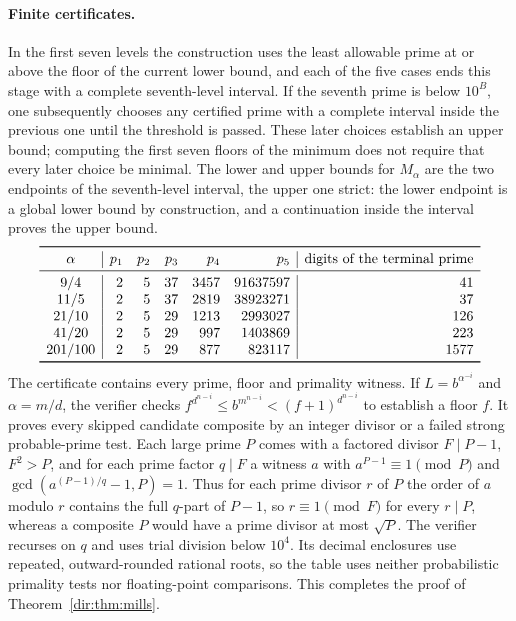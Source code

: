 \paragraph{Finite certificates.}
In the first seven levels the construction uses the least allowable prime at or above
the floor of the current lower bound, and each of the five cases ends this stage with a
complete seventh-level interval. If the seventh prime is below $10^B$, one subsequently
chooses any certified prime with a complete interval inside the previous one until the
threshold is passed. These later choices establish an upper bound; computing the first
seven floors of the minimum does not require that every later choice be minimal. The
lower and upper bounds for $M_\alpha$ are the two endpoints of the seventh-level
interval, the upper one strict: the lower endpoint is a global lower bound by
construction, and a continuation inside the interval proves the upper bound.
\[
\begin{array}{c|rrrrr|r}
\toprule
\alpha &p_1&p_2&p_3&p_4&p_5& \text{digits of the terminal prime}\\
\midrule
9/4&2&5&37&3457&91637597&41\\
11/5&2&5&37&2819&38923271&37\\
21/10&2&5&29&1213&2993027&126\\
41/20&2&5&29&997&1403869&223\\
201/100&2&5&29&877&823117&1577\\
\bottomrule
\end{array}
\]
The certificate contains every prime, floor and primality witness. If $L=b^{\alpha^{-i}}$ and $\alpha=m/d$, the verifier
checks $f^{d^{n-i}}\le b^{m^{n-i}}<(f+1)^{d^{n-i}}$ to establish a floor $f$. It proves
every skipped candidate composite by an integer divisor or a failed strong
probable-prime test. Each large prime $P$ comes with a factored divisor $F\mid P-1$,
$F^2>P$, and for each prime factor $q\mid F$ a witness $a$ with
$a^{P-1}\equiv1\pmod P$ and $\gcd(a^{(P-1)/q}-1,P)=1$. Thus for each prime divisor $r$
of $P$ the order of $a$ modulo $r$ contains the full $q$-part of $P-1$, so
$r\equiv1\pmod F$ for every $r\mid P$, whereas a composite $P$ would have a prime
divisor at most $\sqrt P$. The verifier recurses on $q$ and uses trial division below
$10^4$. Its decimal enclosures use repeated, outward-rounded rational roots, so the
table uses neither probabilistic primality tests nor floating-point comparisons. This
completes the proof of Theorem~\ref{dir:thm:mills}.

